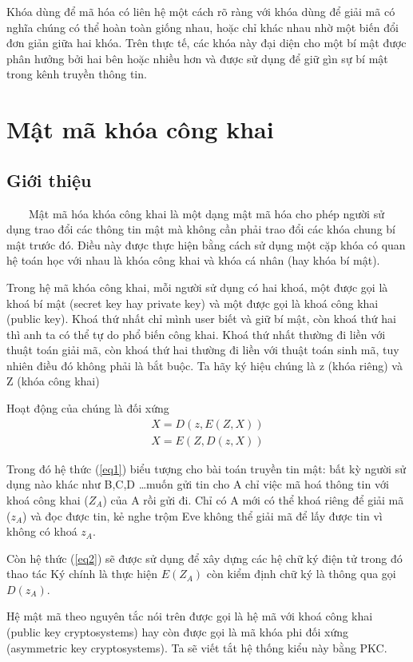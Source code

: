 \documentclass[a4paper,12pt]{report}
\begin{document}
Khóa dùng để mã hóa có liên hệ một cách rõ ràng với khóa dùng để giải mã có nghĩa chúng có thể hoàn toàn giống nhau, hoặc chỉ khác nhau nhờ một biến đổi đơn giản giữa hai khóa. Trên thực tế, các khóa này đại diện cho một bí mật được phân hưởng bởi hai bên hoặc nhiều hơn và được sử dụng để giữ gìn sự bí mật trong kênh truyền thông tin.



\section{Mật mã khóa công khai}
\subsection*{Giới thiệu}
\ \ \ \ Mật mã hóa khóa công khai là một dạng mật mã hóa cho phép người sử dụng trao đổi các thông tin mật mà không cần phải trao đổi các khóa chung bí mật trước đó. Điều này được thực hiện bằng cách sử dụng một cặp khóa có quan hệ toán học với nhau là khóa công khai và khóa cá nhân (hay khóa bí mật). 

Trong hệ mã khóa công khai, mỗi người sử dụng có hai khoá, một được gọi là khoá bí mật (secret key hay private key) và một được gọi là khoá công khai (public key). Khoá thứ
nhất chỉ mình user biết và giữ bí mật, còn khoá thứ hai thì anh ta có thể tự do phổ biến
công khai. Khoá thứ nhất thường đi liền với thuật toán giải mã, còn khoá thứ hai thường đi liền với thuật toán sinh mã, tuy nhiên điều đó không phải là bắt buộc. Ta hãy
ký hiệu chúng là z (khóa riêng) và Z (khóa công khai)

Hoạt động của chúng là đối xứng
\begin{align}
X = D(z, E(Z,X)) \label{eq1} \\
X = E(Z, D(z,X)) \label{eq2}
\end{align}

Trong đó hệ thức (\ref{eq1}) biểu tượng cho bài toán truyền tin mật: bất kỳ người sử dụng nào khác như B,C,D \ldots muốn gửi tin cho A chỉ việc mã hoá thông tin với khoá công khai ($Z_A$) của A rồi gửi đi. Chỉ có A mới có thể khoá riêng để giải mã ($z_A$) và đọc được tin, kẻ nghe trộm Eve không thể giải mã để lấy được tin vì không có khoá $z_A$.

Còn hệ thức (\ref{eq2}) sẽ được sử dụng để xây dựng các hệ chữ ký điện tử trong đó thao tác Ký chính là thực hiện $E(Z_A)$ còn kiểm định chữ ký là thông qua gọi $D(z_A)$.

Hệ mật mã theo nguyên tắc nói trên được gọi là hệ mã với khoá công khai (public key cryptosystems) hay còn được gọi là mã khóa phi đối xứng (asymmetric key cryptosystems). Ta sẽ viết tắt hệ thống kiểu này bằng PKC.
\end{document}
